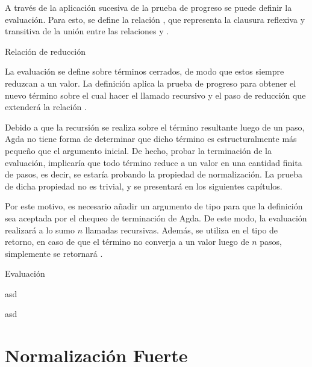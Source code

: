 A través de la aplicación sucesiva de la prueba de progreso se puede definir la evaluación.
Para esto, se define la relación \type{$\_\rightsquigarrow\_$}, que representa la clausura reflexiva y transitiva de la unión entre las relaciones \type{$\_\hookrightarrow\_$} y \type{$\_\rightleftarrows\_$}.

\begin{codigo}
	Relación de reducción
\end{codigo}

La evaluación se define sobre términos cerrados, de modo que estos siempre reduzcan a un valor.
La definición aplica la prueba de progreso para obtener el nuevo término sobre el cual hacer el llamado recursivo y el paso de reducción que extenderá la relación \type{$\_\rightsquigarrow\_$}.

Debido a que la recursión se realiza sobre el término resultante luego de un paso, Agda no tiene forma de determinar que dicho término es estructuralmente más pequeño que el argumento inicial.
De hecho, probar la terminación de la evaluación, implicaría que todo término reduce a un valor en una cantidad finita de pasos, es decir, se estaría probando la propiedad de normalización.
La prueba de dicha propiedad no es trivial, y se presentará en los siguientes capítulos.

Por este motivo, es necesario añadir un argumento de tipo  para que la definición sea aceptada por el chequeo de terminación de Agda.
De este modo, la evaluación realizará a lo sumo $n$ llamadas recursivas.
Además, se utiliza  en el tipo de retorno, en caso de que el término no converja a un valor luego de $n$ pasos, simplemente se retornará .


\begin{codigo}
	Evaluación
\end{codigo}

\begin{example}
	asd
\end{example}

\begin{example}
	asd
\end{example}


\section{Normalización Fuerte}

